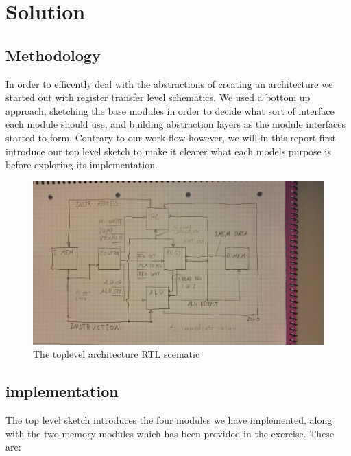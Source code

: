 \chapter{Solution}

\section{Methodology}

In order to efficently deal with the abstractions of creating an architecture we started out with register transfer level schematics. 
We used a bottom up approach, sketching the base modules in order to decide what sort of interface each module should use, and building abstraction layers as the module interfaces started to form.
Contrary to our work flow however, we will in this report first introduce our top level sketch to make it clearer what each models purpose is before exploring its implementation.

\begin{figure}[h!]
    \includegraphics[width=\linewidth]{img/toplevel.jpg}
    \caption{The toplevel architecture RTL scematic}
    \label{fig:toplevel}
\end{figure}

\section{implementation}
The top level sketch introduces the four modules we have implemented, along with the two memory modules which has been provided in the exercise.
These are:

